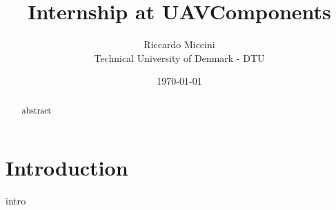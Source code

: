 \documentclass[12pt, a4paper, oneside, twocolumn, final]{article}
\title{Internship at UAVComponents}
\author{Riccardo Miccini  \\
	Technical University of Denmark - DTU \\
	}
\date{\today}
\begin{document}
\maketitle


\begin{abstract}
abstract 
\end{abstract}

\tableofcontents

\section{Introduction}
intro
\end{document}
